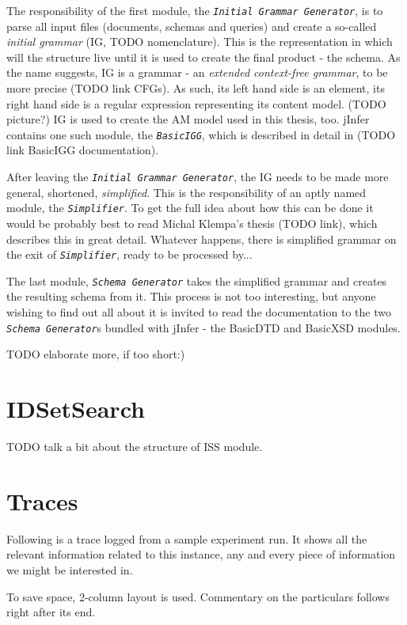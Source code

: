 \documentclass[a4paper,12pt,oneside]{report}
\newcommand{\jmodule}[1]{\texttt{\textit{#1}}}
\begin{document}
The responsibility of the first module, the \jmodule{Initial Grammar Generator}, is to parse all input files (documents, schemas and queries) and create a so-called \textit{initial grammar} (IG, TODO nomenclature). This is the representation in which will the structure live until it is used to create the final product - the schema. As the name suggests, IG is a grammar - an \textit{extended context-free grammar}, to be more precise (TODO link CFGs). As such, its left hand side is an element, its right hand side is a regular expression representing its content model. (TODO picture?) IG is used to create the AM model used in this thesis, too. jInfer contains one such module, the \jmodule{BasicIGG}, which is described in detail in (TODO link BasicIGG documentation).

After leaving the \jmodule{Initial Grammar Generator}, the IG needs to be made more general, shortened, \textit{simplified}. This is the responsibility of an aptly named module, the \jmodule{Simplifier}. To get the full idea about how this can be done it would be probably best to read Michal Klempa's thesis (TODO link), which describes this in great detail. Whatever happens, there is simplified grammar on the exit of \jmodule{Simplifier}, ready to be processed by...

The last module, \jmodule{Schema Generator} takes the simplified grammar and creates the resulting schema from it. This process is not too interesting, but anyone wishing to find out all about it is invited to read the documentation to the two \jmodule{Schema Generator}s bundled with jInfer - the BasicDTD and BasicXSD modules.

TODO elaborate more, if too short:)

\chapter{IDSetSearch}
\label{iss}

TODO talk a bit about the structure of ISS module.

\chapter{Traces}
\label{traces}

Following is a trace logged from a sample experiment run. It shows all the relevant information related to this instance, any and every piece of information we might be interested in.

To save space, 2-column layout is used. Commentary on the particulars follows right after its end.
\end{document}
